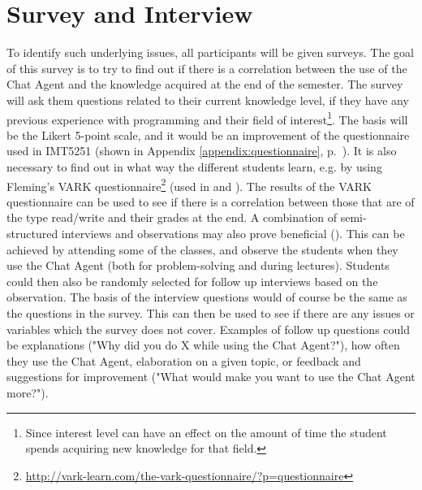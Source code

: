 \section{Survey and Interview}
\label{chapter4:survey_and_interview}
To identify such underlying issues, all participants will be given surveys. The goal of this survey is to try to find out if there is a correlation between the use of the 
Chat Agent and the knowledge acquired at the end of the semester. The survey will ask them questions related to their current knowledge level, if they have any previous 
experience with programming and their field of interest\footnote{Since interest level can have an effect on the amount of time the student spends acquiring new knowledge 
	for that field.}. The basis will be the Likert 5-point scale, and it would be an improvement of the questionnaire used in IMT5251 (shown in Appendix \ref{appendix:questionnaire}, 
p.~\pageref{appendix:questionnaire}). It is also necessary to find out in what way the different students learn, e.g. by using Fleming's VARK 
 questionnaire\footnote{\url{http://vark-learn.com/the-vark-questionnaire/?p=questionnaire}} (used in \citet[p.~152]{Kowalski2013} and \citet{Sarabdeen2013}). 
The results of the VARK questionnaire can be used to see if there is a correlation between those that are of the type read/write and their grades at the end.
\newpage\noindent
A combination of semi-structured interviews and observations may also prove beneficial (\citet{Fincher2011}). This can be achieved by attending some of the classes, and 
observe the students when they use the Chat Agent (both for problem-solving and during lectures). Students could then also be randomly selected for follow up interviews 
based on the observation. The basis of the interview questions would of course be the same as the questions in the survey. This can then be used to see if there are any 
issues or variables which the survey does not cover. Examples of follow up questions could be explanations ("Why did you do X while using the Chat Agent?"), how often 
they use the Chat Agent, elaboration on a given topic, or feedback and suggestions for improvement ("What would make you want to use the Chat Agent more?"). 

